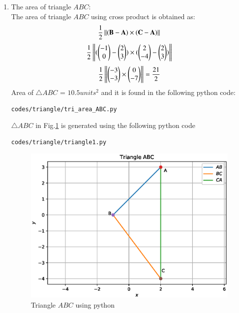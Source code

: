 \renewcommand{\theequation}{\theenumi}
\begin{enumerate}[label=\arabic*.,ref=\thesubsection.\theenumi]
\item The area of triangle $ABC$: \\
\solution The area of triangle $ABC$ using cross product is obtained as:
$$\frac{1}{2}\left\lVert(\mathbf{B}-\mathbf{A})\times(\mathbf{C}-\mathbf{A})\right\rVert$$
$$\frac{1}{2}\left\lVert(\begin{pmatrix}-1\\0\end{pmatrix}-\begin{pmatrix}2\\3\end{pmatrix})\times(\begin{pmatrix}2\\-4\end{pmatrix}-\begin{pmatrix}2\\3\end{pmatrix})\right\rVert$$
$$\frac{1}{2}\left\lVert\begin{pmatrix}-3\\-3\end{pmatrix} \times \begin{pmatrix}0\\-7\end{pmatrix}\right\rVert = \frac{21}{2}$$
Area of $\triangle{ABC}$ = $10.5 units^2$
and it is found in the following python code:
\begin{lstlisting}
codes/triangle/tri_area_ABC.py
\end{lstlisting} 

$\triangle{ABC}$ in Fig.\ref{fig:triangle_1}  is generated using the following python code
\begin{lstlisting}
codes/triangle/triangle1.py
\end{lstlisting}
\begin{figure}[!ht]
\centering
\includegraphics[width=\columnwidth]{./codes/triangle/triangle1.eps}
\caption{Triangle $ABC$ using python}
\label{fig:triangle_1}
\end{figure} 


\end{enumerate}
